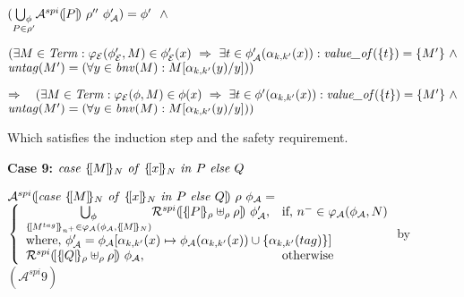 \documentclass[10pt,a4paper,final,oneside,fleqn]{book}
\begin{document}
\noindent
$(\underset{P\in\rho'}{\bigcup_\phi}\mathcal{A}^{spi}(\![P]\!)~\rho''~\phi'_\mathcal{A})=\phi'~~\wedge\vspace{3mm}$

\noindent
$(\exists M\in\mbox{{\itshape Term\/}}:\varphi_\mathcal{E}(\phi'_\mathcal{E},M)\in\phi'_\mathcal{E}(x)~\Rightarrow~\exists t\in\phi'_\mathcal{A}(\alpha_{k,k'}(x)):\mbox{{\itshape value\_of\/}}(\{t\})=\{M'\}~\wedge$\\
$\mbox{{\itshape untag\/}}(M')=(\forall y\in\mbox{{\itshape bnv\/}}(M):M[\alpha_{k,k'}(y)/y]))$\vspace{5mm}

\noindent
$\Rightarrow~~~(\exists M\in\mbox{{\itshape Term\/}}:\varphi_\mathcal{E}(\phi,M)\in\phi(x)~\Rightarrow~\exists t\in\phi'(\alpha_{k,k'}(x)): \mbox{{\itshape value\_of\/}}(\{t\})=\{M'\}~\wedge$\\
$\mbox{{\itshape untag\/}}(M')=(\forall y\in\mbox{{\itshape bnv\/}}(M):M[\alpha_{k,k'}(y)/y]))$\vspace{5mm}

\noindent
Which satisfies the induction step and the safety requirement.\vspace{5mm}

\noindent
{\bf Case 9:} $\mbox{{\itshape case\/} }\{\![M]\!\}_N\mbox{ {\itshape of\/} }\{\![x]\!\}_N\mbox{ {\itshape in\/} }P\mbox{ {\itshape else\/} }Q$

\noindent
$\mathcal{A}^{spi}(\![\mbox{{\itshape case\/} }\{\![M]\!\}_N\mbox{ {\itshape of\/} }\{\![x]\!\}_N\mbox{ {\itshape in\/} }P\mbox{ {\itshape else\/} }Q]\!)~\rho~\phi_\mathcal{A}=$\\
$\left\{\begin{array}{ll}
\underset{\{\![M^{tag}]\!\}_{n^+}\in\varphi_\mathcal{A}(\phi_\mathcal{A},\{\![M]\!\}_N)}{\bigcup_\phi}\mathcal{R}^{spi}(\![\{\!|P|\!\}_\rho\uplus_\rho\rho]\!)~\phi'_\mathcal{A},&\mbox{if, }n^-\in\varphi_\mathcal{A}(\phi_\mathcal{A},N)\\
\multicolumn{2}{l}{\mbox{where, }\phi'_\mathcal{A}=\phi_\mathcal{A}[\alpha_{k,k'}(x)\mapsto\phi_\mathcal{A}(\alpha_{k,k'}(x))\cup\{\alpha_{k,k'}({tag})\}]}\\
\mathcal{R}^{spi}(\![\{\!|Q|\!\}_\rho\uplus_\rho\rho]\!)~\phi_\mathcal{A},&\mbox{otherwise}\\
\end{array}\right.$\hfill by $(\mathcal{A}^{spi} 9)$\vspace{5mm}
\end{document}
